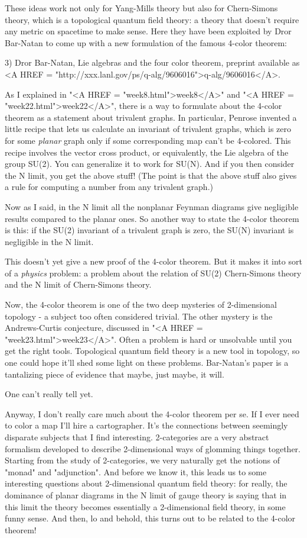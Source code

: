 These ideas work not only for Yang-Mills theory but also for Chern-Simons 
theory, which is a topological quantum field theory: a theory that doesn't 
require any metric on spacetime to make sense.  Here they have been exploited
by Dror Bar-Natan to come up with a new formulation of the famous 4-color 
theorem:

3) Dror Bar-Natan, Lie algebras and the four color theorem, preprint
available as <A HREF = "http://xxx.lanl.gov/ps/q-alg/9606016">q-alg/9606016</A>.

As I explained in "<A HREF = "week8.html">week8</A>" and "<A HREF = "week22.html">week22</A>", there is a way to formulate
about the 4-color theorem as a statement about trivalent graphs.
In particular, Penrose invented a little recipe that lets us calculate an 
invariant of trivalent graphs, which is zero for some \emph{planar} graph
only if some corresponding map can't be 4-colored.  This recipe involves 
the vector cross product, or equivalently, the Lie algebra of the group SU(2).  
You can generalize it to work for SU(N).  And if you then consider the 
N \to  \infty  limit, you get the above stuff!  (The point is that
the above stuff also gives a rule for computing a number from any 
trivalent graph.)

Now as I said, in the N \to  \infty  limit all the nonplanar Feynman diagrams 
give negligible results compared to the planar ones.  So another way to state 
the 4-color theorem is this: if the SU(2) invariant of a trivalent graph
is zero, the SU(N) invariant is negligible in the N \to  \infty  limit.

This doesn't yet give a new proof of the 4-color theorem.  But it makes
it into sort of a \emph{physics} problem: a problem about the relation of
SU(2) Chern-Simons theory and the N \to  \infty  limit of Chern-Simons
theory.  

Now, the 4-color theorem is one of the two deep mysteries of 2-dimensional
topology - a subject too often considered trivial.  The other mystery is
the Andrews-Curtis conjecture, discussed in "<A HREF = "week23.html">week23</A>".  Often a problem
is hard or unsolvable until you get the right tools.  Topological quantum
field theory is a new tool in topology, so one could hope it'll shed
some light on these problems.  Bar-Natan's paper is a tantalizing piece
of evidence that maybe, just maybe, it will.

One can't really tell yet.   

Anyway, I don't really care much about the 4-color theorem per se.  
If I ever need to color a map I'll hire a cartographer.   It's the
connections between seemingly disparate subjects that I find interesting.
2-categories are a very abstract formalism developed to describe 
2-dimensional ways of glomming things together.  Starting from the study
of 2-categories, we very naturally get the notions of "monad" and "adjunction".
And before we know it, this leads us to some interesting questions
about 2-dimensional quantum field theory: for really, the dominance of
planar diagrams in the N \to  \infty  limit of gauge theory is saying that in 
this limit the theory becomes essentially a 2-dimensional field theory, 
in some funny sense.  And then, lo and behold, this turns out to be related to 
the 4-color theorem!  

